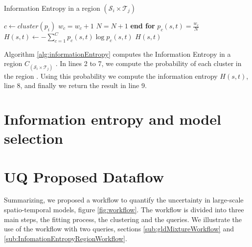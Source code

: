 \begin{algorithm} 
\caption{Information Entropy in a region $(\mathcal{S}_{i} \times \mathcal{T}_{j})$}\label{alg:informationEntropy}
\begin{algorithmic}[1] 
\State $c \gets cluster(p_i)$
\State $w_c= w_c+1$
\State $N=N+1$
\EndFor
\State \textbf{end for}
\State $p_{c}(s,t)= \frac{w_c}{N}$
\State $H(s, t) \gets -\sum_{c=1}^C p_{c}(s,t)\log p_{c}(s,t)$
\State \Return $H(s, t)$
\EndFunction 
\end{algorithmic} 
\end{algorithm} 


Algorithm \ref{alg:informationEntropy}  computes the Information Entropy in a region $C_{(\mathcal{S}_{i} \times \mathcal{T}_{j})}$ . In lines 2 to 7, we compute the probability of each cluster in the region . Using this probability we compute the information entropy $H(s, t)$, line 8, and finally we return the result in line 9.

\section{Information entropy and model selection}

\section{UQ Proposed Dataflow}
Summarizing, we proposed a workflow to quantify the uncertainty in large-scale spatio-temporal models, figure \ref{fig:workflow}. The workflow is divided into three main steps, the fitting process, the clustering and the queries. We illustrate the use of the workflow with  two queries, sections \ref{sub:gldMixtureWorkflow} and \ref{sub:InfomationEntropyRegionWorkflow}.

